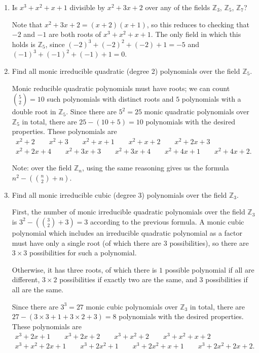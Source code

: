 \documentclass[12pt]{article}
\newcommand{\ZZ}{\mathbb{Z}}
\begin{document}
\begin{enumerate}
    \item Is $x^3+x^2+x+1$ divisible by $x^2+3x+2$ over any of the fields $\ZZ_3$, $\ZZ_5$, $\ZZ_7$? \par
        Note that $x^2 + 3x + 2 = (x + 2)(x + 1)$, so this reduces to checking that $-2$ and $-1$ are both roots of $x^3 + x^2 + x + 1$. The only field in which this holds is $\ZZ_5$, since $(-2)^3 + (-2)^2 + (-2) + 1 = -5$ and $(-1)^3 + (-1)^2 + (-1) + 1 = 0$.

    \item Find all monic irreducible quadratic (degree 2) polynomials over the field $\ZZ_5$. \par
        Monic reducible quadratic polynomials must have roots; we can count $\binom{5}{2} = 10$ such polynomials with distinct roots and $5$ polynomials with a double root in $\ZZ_5$. Since there are $5^2 = 25$ monic quadratic polynomials over $\ZZ_5$ in total, there are $25 - (10 + 5) = 10$ polynomials with the desired properties. These polynomials are
        \begin{gather*}
            x^2 + 2 \qquad x^2 + 3 \qquad x^2 + x + 1 \qquad x^2 + x + 2 \qquad x^2 + 2x + 3 \\
            x^2 + 2x + 4 \qquad x^2 + 3x + 3 \qquad x^2 + 3x + 4 \qquad x^2 + 4x + 1 \qquad x^2 + 4x + 2.
        \end{gather*} \par
        Note: over the field $\ZZ_n$, using the same reasoning gives us the formula $n^2 - \left( \binom{n}{2} + n \right)$.

    \item Find all monic irreducible cubic (degree 3) polynomials over the field $\ZZ_3$. \par
        First, the number of monic irreducible quadratic polynomials over the field $\ZZ_3$ is $3^2 - \left( \binom{3}{2} + 3 \right) = 3$ according to the previous formula. A monic cubic polynomial which includes an irreducible quadratic polynomial as a factor must have only a single root (of which there are $3$ possibilities), so there are $3 \times 3$ possibilities for such a polynomial. \par
        Otherwise, it has three roots, of which there is $1$ possible polynomial if all are different, $3 \times 2$ possibilities if exactly two are the same, and $3$ possibilities if all are the same. \par
        Since there are $3^3 = 27$ monic cubic polynomials over $\ZZ_3$ in total, there are $27 - (3 \times 3 + 1 + 3 \times 2 + 3) = 8$ polynomials with the desired properties. These polynomials are
        \begin{gather*}
            x^3 + 2x + 1 \qquad x^3 + 2x + 2 \qquad x^3 + x^2 + 2 \qquad x^3 + x^2 + x + 2 \\
            x^3 + x^2 + 2x + 1 \qquad x^3 + 2x^2 + 1 \qquad x^3 + 2x^2 + x + 1 \qquad x^3 + 2x^2 + 2x + 2.
        \end{gather*}


\end{enumerate}
\end{document}
